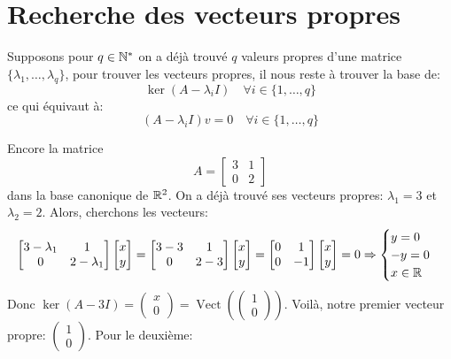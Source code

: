 \section{Recherche des vecteurs propres}
Supposons pour $q \in \mathbb{N}^{*}$ on a déjà trouvé $q$ valeurs propres d'une matrice $\{ \lambda_1, \ldots, \lambda_q \}$, pour trouver les vecteurs propres, il nous reste à trouver la base de:
\[
    \ker(A - \lambda_iI) \quad \forall i \in \{1, \ldots, q\}
\] 
ce qui équivaut à:
\[
\left( A - \lambda_i I \right)v = 0 \quad \forall i \in \{1, \ldots, q\}
\] 

\begin{eg}
   Encore la matrice  
   \[
       A = \begin{bmatrix} 3 & 1\\ 0 & 2 \end{bmatrix} 
   \] 
   dans la base canonique de $\mathbb{R}^2$. On a déjà trouvé ses vecteurs propres: $\lambda_1 = 3$ et $\lambda_2 = 2$. Alors, cherchons les vecteurs:
   \[
       \begin{bmatrix} 3 - \lambda_1 & 1 \\ 0 & 2 - \lambda_1 \end{bmatrix}\begin{bmatrix} x \\ y \end{bmatrix} = \begin{bmatrix} 3 - 3 & 1 \\ 0 & 2 - 3 \end{bmatrix}\begin{bmatrix} x \\ y \end{bmatrix} = \begin{bmatrix} 0 & 1 \\ 0 & -1 \end{bmatrix}\begin{bmatrix} x \\ y \end{bmatrix} = 0 
       \Rightarrow \begin{cases}
           y = 0\\
           -y = 0\\
           x \in \mathbb{R}
       \end{cases}
   \] 
   Donc $\ker(A - 3I) = \begin{pmatrix} x \\ 0 \end{pmatrix} =  \operatorname{Vect}(\begin{pmatrix} 1 \\ 0 \end{pmatrix} )$. Voilà, notre premier vecteur propre: $\begin{pmatrix} 1 \\ 0 \end{pmatrix} $. Pour le deuxième:

\end{eg}
